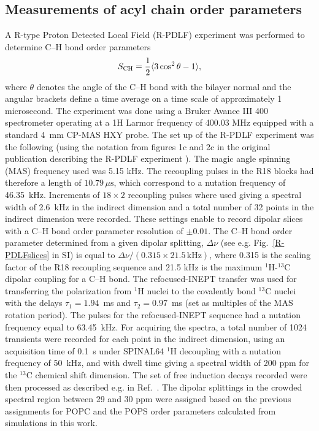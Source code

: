 \documentclass[journal=jpcbfk,manuscript=article]{achemso}
\begin{document}
\subsection{Measurements of acyl chain order parameters}
A R-type Proton Detected Local Field (R-PDLF) experiment was performed to determine C--H bond order
parameters
\begin{equation}\label{OPequation}
  S_{\rm{CH}}=\frac{1}{2}\langle3\cos^2\theta-1\rangle,
\end{equation}
  where $\theta$ denotes the angle of the C--H bond
with the bilayer normal and the angular brackets define a time average on a time scale of approximately 1 microsecond.
The experiment was done using a Bruker Avance III 400 spectrometer operating at a 1H Larmor frequency of 400.03 MHz
equipped with a standard 4~mm CP-MAS HXY probe. The set up of the R-PDLF experiment was the following
(using the notation from figures 1c and 2c in the original publication describing the R-PDLF experiment \cite{dvinskikh04}).
The magic angle spinning (MAS) frequency used was 5.15 kHz. The recoupling pulses in the R18 blocks had
therefore a length of $10.79 \, \mu \mathrm{s}$, which correspond to a nutation frequency of 46.35~kHz. Increments of $18 \times 2$ recoupling
pulses where used giving a spectral width of 2.6~kHz in the indirect dimension and a total number of 32 points in
the indirect dimension were recorded. These settings enable to record dipolar slices with a C--H bond order parameter
resolution of $\pm 0.01$. The C--H bond order parameter determined from a given dipolar
splitting, $\Delta \nu$ (see e.g. Fig.~\ref{R-PDLFslices} in SI)
is equal to $\Delta \nu / (0.315 \times 21.5 \, \mathrm{kHz})$, where 0.315 is
the scaling factor of the R18 recoupling sequence and 21.5 kHz is the maximum $^1$H-$^{13}$C dipolar coupling for a C--H bond.
The refocused-INEPT transfer \cite{morris79,burum80} %
was used for transferring the polarization from $^1$H nuclei to the covalently bond $^{13}$C nuclei with the delays $\tau_1 = 1.94$~ms and $\tau_2 = 0.97$~ms
(set as multiples of the MAS rotation period). The pulses for the refocused-INEPT sequence had a nutation frequency equal to 63.45~kHz.
For acquiring the spectra, a total number of 1024 transients were recorded for each point in the indirect dimension, using an acquisition
time of 0.1~s under SPINAL64 $^1$H decoupling \cite{fung00} with a nutation frequency of 50~kHz, and with dwell time giving a spectral
width of 200 ppm for the $^{13}$C chemical shift dimension. The set of free induction decays recorded were then processed as
described e.g. in Ref.~. The dipolar splittings in the crowded spectral region
between 29 and 30 ppm were assigned based on the previous assignments for POPC \cite{ferreira13} 
and the POPS order parameters calculated from simulations in this work.
 
\end{document}

